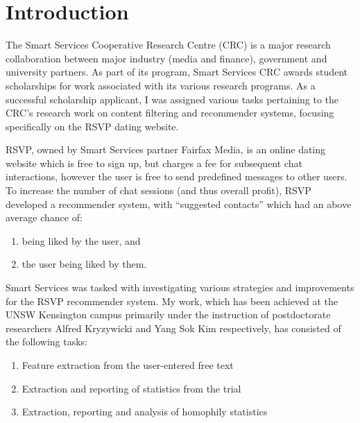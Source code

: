 \documentclass{report}
\begin{document}
\maketitle
\tableofcontents

\chapter{Introduction}

The Smart Services Cooperative Research Centre (CRC) is a major research collaboration between major industry (media and finance), government and university partners. As part of its program, Smart Services CRC awards student scholarships for work associated with its various research programs. As a successful scholarship applicant, I was assigned various tasks pertaining to the CRC's research work on content filtering and recommender systems, focusing specifically on the RSVP dating website.

RSVP, owned by Smart Services partner Fairfax Media, is an online dating website which is free to sign up, but charges a fee for subsequent chat interactions, however the user is free to send predefined messages to other users. To increase the number of chat sessions (and thus overall profit), RSVP developed a recommender system, with ``suggested contacts'' which had an above average chance of:
\begin{enumerate}
  \item being liked by the user, and
  \item the user being liked by them.
\end{enumerate}

Smart Services was tasked with investigating various strategies and improvements for the RSVP recommender system. My work, which has been achieved at the UNSW Kensington campus primarily under the instruction of postdoctorate researchers Alfred Kryzywicki and Yang Sok Kim respectively, has consisted of the following tasks:
\begin{enumerate}
  \item Feature extraction from the user-entered free text
  \item Extraction and reporting of statistics from the trial
  \item Extraction, reporting and analysis of homophily statistics
\end{enumerate}
\end{document}
